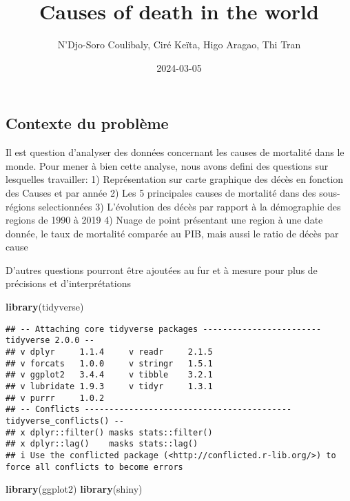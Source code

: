 \documentclass[
]{article}
\title{Causes of death in the world}
\author{N'Djo-Soro Coulibaly, Ciré Keïta, Higo Aragao, Thi Tran}
\date{2024-03-05}
\newenvironment{Shaded}{\begin{snugshade}}{\end{snugshade}}
\newcommand{\FunctionTok}[1]{\textcolor[rgb]{0.13,0.29,0.53}{\textbf{#1}}}
\newcommand{\NormalTok}[1]{#1}
\begin{document}
\maketitle

\hypertarget{contexte-du-probluxe8me}{%
\subsection{Contexte du problème}\label{contexte-du-probluxe8me}}

Il est question d'analyser des données concernant les causes de
mortalité dans le monde. Pour mener à bien cette analyse, nous avons
defini des questions sur lesquelles travailler: 1) Représentation sur
carte graphique des décès en fonction des Causes et par année 2) Les 5
principales causes de mortalité dans des sous-régions selectionnées 3)
L'évolution des décès par rapport à la démographie des regions de 1990 à
2019 4) Nuage de point présentant une region à une date donnée, le taux
de mortalité comparée au PIB, mais aussi le ratio de décès par cause

D'autres questions pourront être ajoutées au fur et à mesure pour plus
de précisions et d'interprétations

\begin{Shaded}
\begin{Highlighting}[]
\FunctionTok{library}\NormalTok{(tidyverse)}
\end{Highlighting}
\end{Shaded}

\begin{verbatim}
## -- Attaching core tidyverse packages ------------------------ tidyverse 2.0.0 --
## v dplyr     1.1.4     v readr     2.1.5
## v forcats   1.0.0     v stringr   1.5.1
## v ggplot2   3.4.4     v tibble    3.2.1
## v lubridate 1.9.3     v tidyr     1.3.1
## v purrr     1.0.2     
## -- Conflicts ------------------------------------------ tidyverse_conflicts() --
## x dplyr::filter() masks stats::filter()
## x dplyr::lag()    masks stats::lag()
## i Use the conflicted package (<http://conflicted.r-lib.org/>) to force all conflicts to become errors
\end{verbatim}

\begin{Shaded}
\begin{Highlighting}[]
\FunctionTok{library}\NormalTok{(ggplot2)}
\FunctionTok{library}\NormalTok{(shiny)}
\end{Highlighting}
\end{Shaded}
\end{document}
